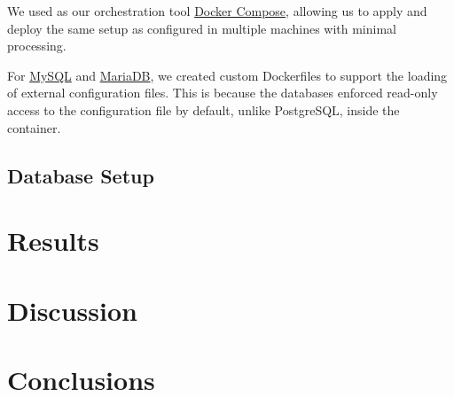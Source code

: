 We used as our orchestration tool \hyperref[sec:docker-compose]{Docker Compose}, allowing us to apply and deploy the same setup as configured in multiple machines with minimal processing.

For \hyperref[sec:dockerfile-mysql]{MySQL} and \hyperref[sec:dockerfile-mariadb]{MariaDB}, we created custom Dockerfiles to support the loading of external configuration files. This is because the databases enforced read-only access to the configuration file by default, unlike PostgreSQL, inside the container.

\subsection{Database Setup}
\label{sec:database-setup}

\section{Results}
\label{sec:results}

\section{Discussion}
\label{sec:discussion}

\section{Conclusions}
\label{sec:conclusions}
